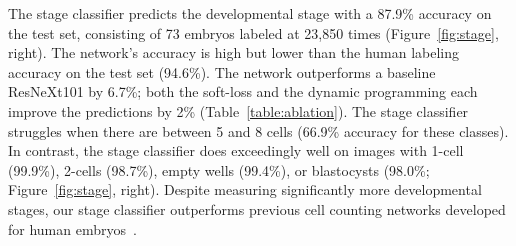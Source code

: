 
 The stage classifier predicts the developmental stage with a 87.9\% accuracy on the test set, consisting of 73 embryos labeled at 23,850 times (Figure~\ref{fig:stage}, right). The network's accuracy is high but lower than the human labeling accuracy on the test set (94.6\%). The network outperforms a baseline ResNeXt101 by 6.7\%; both the soft-loss and the dynamic programming each improve the predictions by 2\% (Table~\ref{table:ablation}). The stage classifier struggles when there are between 5 and 8 cells (66.9\% accuracy for these classes). In contrast, the stage classifier does exceedingly well on images with 1-cell (99.9\%), 2-cells (98.7\%), empty wells (99.4\%), or blastocysts (98.0\%; Figure~\ref{fig:stage}, right). Despite measuring significantly more developmental stages, our stage classifier outperforms previous cell counting networks developed for human embryos~\cite{khan2016deep,lau2019embryo}.

